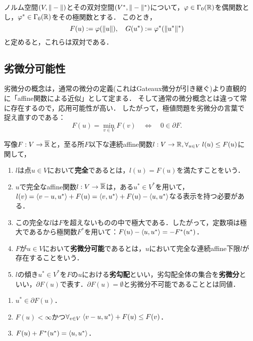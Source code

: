 \documentclass[uplatex,dvipdfmx]{jsreport}
\begin{document}
\begin{example}
    ノルム空間$(V,\|-\|)$とその双対空間$(V^*,\|-\|^*)$について，$\varphi\in\Gamma_0(\mathbb{R})$を偶関数とし，$\varphi^*\in\Gamma_0(\mathbb{R})$をその極関数とする．
    このとき，
    \[F(u):=\varphi(\|u\|),\quad G(u^*):=\varphi^*(\|u^*\|^*)\]
    と定めると，これらは双対である．
\end{example}

\subsection{劣微分可能性}

\begin{tcolorbox}[colframe=ForestGreen, colback=ForestGreen!10!white,breakable,colbacktitle=ForestGreen!40!white,coltitle=black,fonttitle=\bfseries\sffamily,
title=]
    劣微分の概念は，通常の微分の定義(これはGateaux微分が引き継ぐ)より直観的に「affine関数による近似」として定まる．
    そして通常の微分概念とは違って常に存在するので，応用可能性が高い．
    したがって，極値問題を劣微分の言葉で捉え直すのである：
    \[F(u)=\min_{v\in V}F(v)\quad\Leftrightarrow\quad 0\in\partial F.\]
\end{tcolorbox}

\begin{definition}[exact]
    写像$F:V\to\overline{\mathbb{R}}$と，至る所$F$以下な連続affine関数$l:V\to\mathbb{R},\forall_{u\in V}\;l(u)\le F(u)$に関して，
    \begin{enumerate}
        \item $l$は点$u\in V$において\textbf{完全}であるとは，$l(u)=F(u)$を満たすことをいう．
        \item $u$で完全なaffine関数$l:V\to\overline{\mathbb{R}}$は，ある$u^*\in V^*$を用いて，$l(v)=\langle v-u,u^*\rangle+F(u)=\langle v,u^*\rangle+F(u)-\langle u,u^*\rangle$なる表示を持つ必要がある．
        \item この完全な$l$は$F$を超えないものの中で極大である．したがって，定数項は極大であるから極関数$F^*$を用いて：$F(u)-\langle u,u^*\rangle=-F^*(u^*)$．
        \item $F$が$u\in V$において\textbf{劣微分可能}であるとは，$u$において完全な連続affine下限$l$が存在することをいう．
        \item $l$の傾き$u^*\in V^*$を$F$の$u$における\textbf{劣勾配}といい，劣勾配全体の集合を\textbf{劣微分}といい，$\partial F(u)$で表す．$\partial F(u)=\emptyset$と劣微分不可能であることとは同値．
    \end{enumerate}
\end{definition}

\begin{lemma}[劣勾配の特徴付け]\mbox{}
    \begin{enumerate}
        \item $u^*\in\partial F(u)$．
        \item $F(u)<\infty$かつ$\forall_{v\in V}\;\langle v-u,u^*\rangle+F(u)\le F(v)$．
        \item $F(u)+F^*(u^*)=\langle u,u^*\rangle$．
    \end{enumerate}
\end{lemma}
\end{document}
